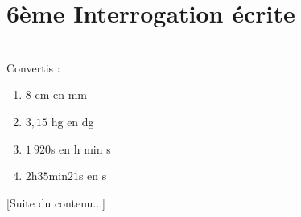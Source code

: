 \documentclass[10pt,openany]{book}
\begin{document}
\pagestyle{empty}
\section*{6\`eme Interrogation \'ecrite}

\\
Convertis :
\begin{multicols}{2}	
\begin{enumerate}
\item $8$ cm en mm
\item $3,15$ hg en dg
\columnbreak
\item $1~920$s en h min s
\item $2$h$35$min$21$s en s
\end{enumerate}
\end{multicols}

[Suite du contenu...]
\end{document}
